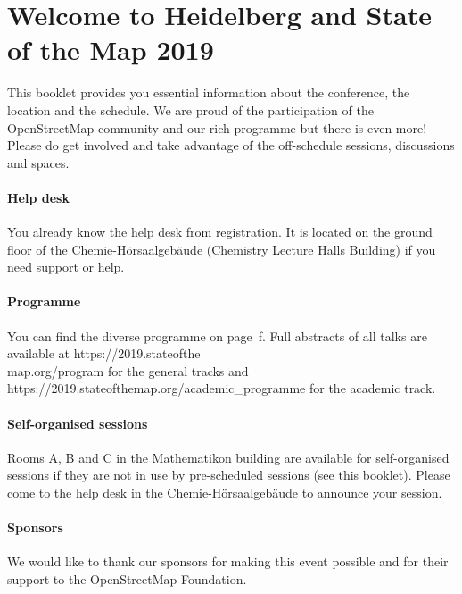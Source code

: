 \newpage
\enlargethispage{1\baselineskip}
\section*{Welcome to Heidelberg and State of the Map 2019} \label{welcome}
This booklet provides you essential information
about the conference, the location and the schedule.  We are proud of the participation of the
OpenStreetMap community and our rich programme but there is even more!  Please do get involved and
take advantage of the off-schedule sessions, discussions and spaces.

\paragraph*{Help desk} \label{welcome-helpdesk}
You already know the help desk from registration. It is located on the ground floor of the Chemie-Hörsaalgebäude (Chemistry
Lecture Halls Building) if you need support or help.

\paragraph*{Programme}
You can find the diverse programme on page~\pageref{saturday}f. Full abstracts of all talks are
available at https://2019.stateofthe\\map.org/program for the general tracks and
https://2019.stateofthemap.org/academic\_programme for the academic track.

\paragraph*{Self-organised sessions} \label{welcome-location}
Rooms A, B and C in the Mathematikon building are available for self-organised sessions if they are not in use by pre-scheduled sessions (see this booklet). Please come to the help desk in the Chemie-Hörsaalgebäude to announce your session.

\paragraph*{Sponsors} \label{welcome-sponsors}
We would like to thank our sponsors for making this event possible and for their support to the
OpenStreetMap Foundation.
\newpage

